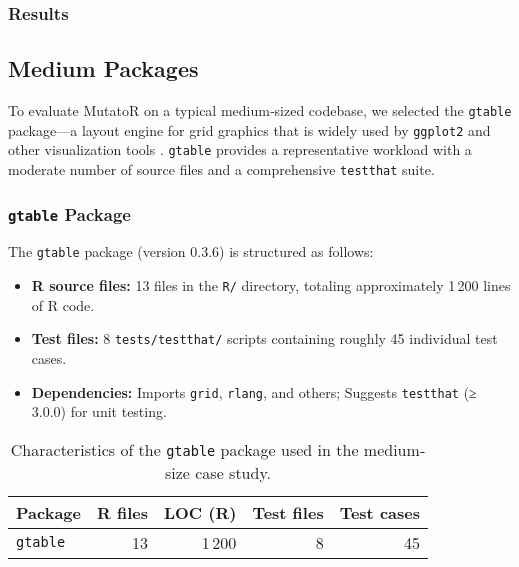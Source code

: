 %

\subsubsection{Results}

\subsection{Medium Packages}

To evaluate MutatoR on a typical medium‐sized codebase, we selected the \texttt{gtable} package—a layout engine for grid graphics that is widely used by \texttt{ggplot2} and other visualization tools \cite{pedersen2024gtable}.  \texttt{gtable} provides a representative workload with a moderate number of source files and a comprehensive \texttt{testthat} suite.

\subsubsection{\texttt{gtable} Package}

The \texttt{gtable} package (version 0.3.6) is structured as follows:

\begin{itemize}
  \item \textbf{R source files:} 13 files in the \texttt{R/} directory, totaling approximately 1\,200 lines of R code.
  \item \textbf{Test files:} 8 \texttt{tests/testthat/} scripts containing roughly 45 individual test cases.
  \item \textbf{Dependencies:} Imports \texttt{grid}, \texttt{rlang}, and others; Suggests \texttt{testthat} (≥ 3.0.0) for unit testing.
\end{itemize}

\begin{table}[htbp]
  \centering
  \begin{tabular}{lrrrr}
    \toprule
    Package  & R files & LOC (R) & Test files & Test cases \\
    \midrule
    \texttt{gtable} & 13      & 1\,200    & 8          & 45         \\
    \bottomrule
  \end{tabular}
  \caption{Characteristics of the \texttt{gtable} package used in the medium‐size case study.}
  \label{tab:gtable-metrics}
\end{table}

